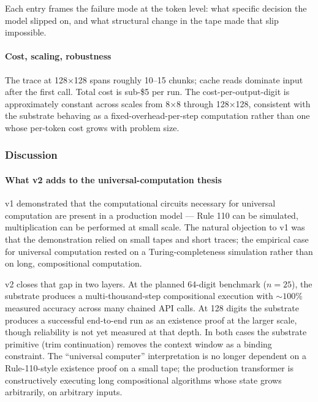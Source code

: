 \documentclass[twocolumn,switch,10pt]{article}
\begin{document}
Each entry frames the failure mode at the token level: what specific
decision the model slipped on, and what structural change in the
tape made that slip impossible.

\paragraph{Cost, scaling, robustness}\label{cost-scaling-robustness}

The trace at 128×128 spans roughly 10--15 chunks; cache reads
dominate input after the first call. Total cost is sub-\$5 per run.
The cost-per-output-digit is approximately constant across scales
from 8×8 through 128×128, consistent with the substrate behaving
as a fixed-overhead-per-step computation rather than one whose
per-token cost grows with problem size.

\subsubsection{Discussion}\label{discussion}

\paragraph{What v2 adds to the universal-computation thesis}\label{what-v2-adds-to-the-universal-computation-thesis}

v1 demonstrated that the computational circuits necessary for
universal computation are present in a production model --- Rule 110
can be simulated, multiplication can be performed at small scale.
The natural objection to v1 was that the demonstration relied on
small tapes and short traces; the empirical case for universal
computation rested on a Turing-completeness simulation rather than
on long, compositional computation.

v2 closes that gap in two layers. At the planned 64-digit benchmark
(\(n = 25\)), the substrate produces a multi-thousand-step
compositional execution with \(\sim 100\%\) measured accuracy across
many chained API calls. At 128 digits the substrate produces a
successful end-to-end run as an existence proof at the larger scale,
though reliability is not yet measured at that depth. In both
cases the substrate primitive (trim continuation) removes the
context window as a binding constraint. The ``universal computer''
interpretation is no longer dependent on a Rule-110-style existence
proof on a small tape; the production transformer is constructively
executing long compositional algorithms whose state grows
arbitrarily, on arbitrary inputs.
\end{document}
